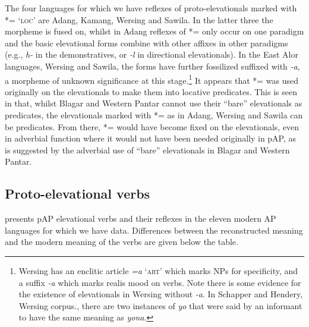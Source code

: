 The four languages for which we have reflexes of proto-elevationals marked with *={\ng} `\textsc{loc}' are Adang, Kamang, Wersing and Sawila. In the latter three the morpheme is fused on, whilst in Adang reflexes of *={\ng} only occur on one paradigm and the basic elevational forms combine with other affixes in other paradigms (e.g., \textit{h}\textit{{\textepsilon}}\textit{{}-} in the demonstratives, or \textit{{}-l}\textit{{\textepsilon}} in directional elevationals). In the East Alor languages, Wersing and Sawila, the forms have further fossilized suffixed with \textit{{}-a}, a morpheme of unknown significance at this stage.\footnote{Wersing has an enclitic article \textit{=a} `\textsc{art}' which marks NPs for specificity, and a suffix \textit{{}-a} which marks realis mood on verbs. Note there is some evidence for the existence of elevationals in Wersing without \textit{{}-a}. In Schapper and Hendery, Wersing corpus., there are two instances of \textit{yo{\ng}} that were said by an informant to have the same meaning as \textit{yona}.} It appears that *={\ng} was used originally on the elevationals to make them into locative predicates. This is seen in that, whilst Blagar and Western Pantar cannot use their ``bare'' elevationals as predicates, the elevationals marked with *={\ng} as in Adang,  Wersing and Sawila can be predicates. From there, *={\ng} would have become fixed on the elevationals, even in adverbial function where it would not have been needed originally in pAP, as is suggested by the adverbial use of ``bare'' elevationals in Blagar and Western Pantar.

\subsection{Proto-elevational verbs}\label{sec:7:4.2}
 presents pAP elevational verbs and their reflexes in the eleven modern AP languages for which we have data. Differences between the reconstructed meaning and the modern meaning of the verbs are given below the table. 

